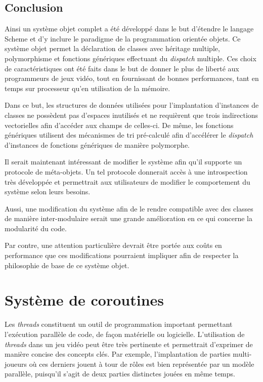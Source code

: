 \documentclass[12pt,twoside,letterpaper,francais]{book}
\begin{document}
\FloatBarrier
\section{Conclusion}
Ainsi un système objet complet a été développé dans le but d'étendre
le langage Scheme et d'y inclure le paradigme de la programmation
orientée objets. Ce système objet permet la déclaration de classes avec
héritage multiple, polymorphisme et fonctions génériques effectuant du
\textit{dispatch} multiple. Ces choix de caractéristiques ont été
faits dans le but de donner le plus de liberté aux programmeurs de
jeux vidéo, tout en fournissant de bonnes performances, tant en temps
sur processeur qu'en utilisation de la mémoire.

Dans ce but, les structures de données utilisées pour l'implantation
d'instances de classes ne possèdent pas d'espaces inutilisés et ne
requièrent que trois indirections vectorielles afin d'accéder aux
champs de celles-ci. De même, les fonctions génériques utilisent des
mécanismes de tri pré-calculé afin d'accélérer le \textit{dispatch}
d'instances de fonctions génériques de manière polymorphe.

Il serait maintenant intéressant de modifier le système afin qu'il
supporte un protocole de méta-objets. Un tel protocole donnerait accès
à une introspection très développée et permettrait aux utilisateurs de
modifier le comportement du système selon leurs besoins.

Aussi, une modification du système afin de le rendre compatible avec
des classes de manière inter-modulaire serait une grande amélioration
en ce qui concerne la modularité du code.

Par contre, une attention particulière devrait être portée aux coûts
en performance que ces modifications pourraient impliquer afin de
respecter la philosophie de base de ce système objet.

\clearpage

\chapter{Système de coroutines} \label{Chap:corout}
Les \textit{threads} constituent un outil de programmation important
permettant l'exécution parallèle de code, de façon matérielle ou
logicielle. L'utilisation de \textit{threads} dans un jeu vidéo peut
être très pertinente et permettrait d'exprimer de manière concise des
concepts clés. Par exemple, l'implantation de parties multi-joueurs où
ces derniers jouent à tour de rôles est bien représentée par un modèle
parallèle, puisqu'il s'agit de deux parties distinctes jouées en même
temps.
\end{document}
